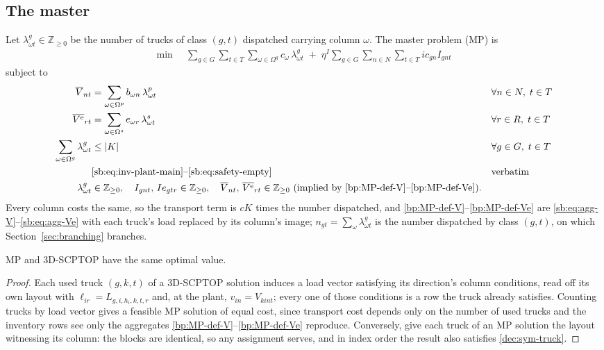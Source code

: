 \subsection{The master}
\label{sec:mp}
\label{sec:master}

Let $\lambda^{g}_{\omega t}\in\mathbb{Z}_{\ge0}$ be the number of
trucks of class $(g,t)$ dispatched carrying column $\omega$. The master
problem (MP) is
\begin{align}
  \min\;\; & \sum_{g\in G}\sum_{t\in T}\sum_{\omega\in \Omega^{g}}
                c_{\omega}\,\lambda^{g}_{\omega t}
    \;+\;\eta^{I}\sum_{g\in G}\sum_{n\in N}\sum_{t\in T} ic_{gn} I_{gnt}
    \label{eq:MPObjective}
\end{align}
subject to
\begin{align}
  \overline{V}_{nt}
    &= \sum_{\omega\in \Omega^{p}} b_{\omega n}\,\lambda^{p}_{\omega t}
    &&\forall n\in N,\;t\in T \label{bp:MP-def-V}\\
  \overline{V^{\mathrm{e}}}_{rt}
    &= \sum_{\omega\in \Omega^{s}} e_{\omega r}\,\lambda^{s}_{\omega t}
    &&\forall r\in R,\;t\in T \label{bp:MP-def-Ve}\\
  \sum_{\omega\in \Omega^{g}} \lambda^{g}_{\omega t} &\le |K|
    &&\forall g\in G,\;t\in T \label{bp:MP-count}\\
  &\text{\eqref{sb:eq:inv-plant-main}--\eqref{sb:eq:safety-empty}}
    &&\text{verbatim} \nonumber\\
  \lambda^{g}_{\omega t}&\in\mathbb{Z}_{\ge0},\quad
  I_{gnt},\,Ie_{gtr}\in\mathbb{Z}_{\ge0},\quad
  \overline{V}_{nt},\,\overline{V^{\mathrm{e}}}_{rt}\in\mathbb{Z}_{\ge0}
  \ \text{(implied by \eqref{bp:MP-def-V}--\eqref{bp:MP-def-Ve})}.
    \nonumber
\end{align}
Every column costs the same, so the transport term is $cK$ times the
number dispatched, and \eqref{bp:MP-def-V}--\eqref{bp:MP-def-Ve} are
\eqref{sb:eq:agg-V}--\eqref{sb:eq:agg-Ve} with each truck's load
replaced by its column's image; $n_{gt}=\sum_{\omega}
\lambda^{g}_{\omega t}$ is the number dispatched by class $(g,t)$, on
which Section~\ref{sec:branching} branches.

\begin{proposition}[equivalence]
\label{prop:equiv}
MP and 3D-SCPTOP have the same optimal value.
\end{proposition}
\begin{proof}
Each used truck $(g,k,t)$ of a 3D-SCPTOP solution induces a load vector
satisfying its direction's column conditions, read off its own layout
with $\ell_{ir}=L_{g,i,h_{i},k,t,r}$ and, at the plant,
$v_{in}=V_{kint}$; every one of those conditions is a row the truck
already satisfies. Counting trucks by load vector gives a feasible MP
solution of equal cost, since transport cost depends only on the number
of used trucks and the inventory rows see only the aggregates
\eqref{bp:MP-def-V}--\eqref{bp:MP-def-Ve} reproduce. Conversely, give
each truck of an MP solution the layout witnessing its column: the
blocks are identical, so any assignment serves, and in index order the
result also satisfies \eqref{dec:sym-truck}.
\end{proof}

